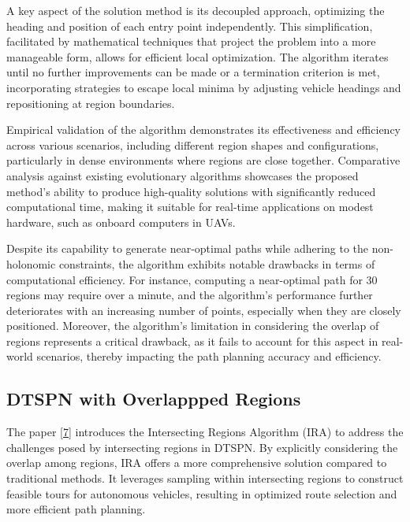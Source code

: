 \vspace*{6mm}

A key aspect of the solution method is its decoupled approach, optimizing the heading and position of each entry point independently. This simplification, facilitated by mathematical techniques that project the problem into a more manageable form, allows for efficient local optimization. The algorithm iterates until no further improvements can be made or a termination criterion is met, incorporating strategies to escape local minima by adjusting vehicle headings and repositioning at region boundaries.

\vspace*{6mm}

Empirical validation of the algorithm demonstrates its effectiveness and efficiency across various scenarios, including different region shapes and configurations, particularly in dense environments where regions are close together. Comparative analysis against existing evolutionary algorithms showcases the proposed method's ability to produce high-quality solutions with significantly reduced computational time, making it suitable for real-time applications on modest hardware, such as onboard computers in UAVs.

\vspace*{6mm}

Despite its capability to generate near-optimal paths while adhering to the non-holonomic constraints, the algorithm exhibits notable drawbacks in terms of computational efficiency. For instance, computing a near-optimal path for 30 regions may require over a minute, and the algorithm's performance further deteriorates with an increasing number of points, especially when they are closely positioned. Moreover, the algorithm's limitation in considering the overlap of regions represents a critical drawback, as it fails to account for this aspect in real-world scenarios, thereby impacting the path planning accuracy and efficiency.



\vspace*{6mm}



\subsection{DTSPN with Overlappped Regions}



The paper \hyperlink{cite.overlap}{[7]} introduces the Intersecting Regions Algorithm (IRA) to address the challenges posed by intersecting regions in DTSPN. By explicitly considering the overlap among regions, IRA offers a more comprehensive solution compared to traditional methods. It leverages sampling within intersecting regions to construct feasible tours for autonomous vehicles, resulting in optimized route selection and more efficient path planning.

